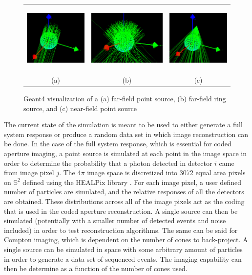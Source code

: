 \documentclass[10pt]{article}
\begin{document}
\begin{figure}[htb!]
\hypertarget{fig2}{}
\centering
\begin{tabular}{ccc}
	\includegraphics[height=100pt]{Figures/FarFieldVis.png} & 
	\includegraphics[height=100pt]{Figures/FarFieldRingVis.png} & 
	\includegraphics[height=100pt]{Figures/NearFieldVis.png} \\ [-0.5ex]
	\scriptsize{(a)} & \scriptsize{(b)} & \scriptsize{(c)}
\end{tabular}
\caption{Geant4 visualization of a (a) far-field point source, (b) far-field ring source, and (c) near-field point source}
\end{figure}


The current state of the simulation is meant to be used to either generate a full system response or produce a random data set in which image reconstruction can be done. In the case of the full system response, which is essential for coded aperture imaging, a point source is simulated at each point in the image space in order to determine the probability that a photon detected in detector $i$ came from image pixel $j$. The 4$\pi$ image space is discretized into 3072 equal area pixels on $\mathbb{S}^2$ defined using the HEALPix library \cite{Healpix2005}. For each image pixel, a user defined number of particles are simulated, and the relative responses of all the detectors are obtained. These distributions across all of the image pixels act as the coding that is used in the coded aperture reconstruction. A single source can then be simulated (potentially with a smaller number of detected events and noise included) in order to test reconstruction algorithms. The same can be said for Compton imaging, which is dependent on the number of cones to back-project. A single source can be simulated in space with some arbitrary amount of particles in order to generate a data set of sequenced events. The imaging capability can then be determine as a function of the number of cones used.
\end{document}
